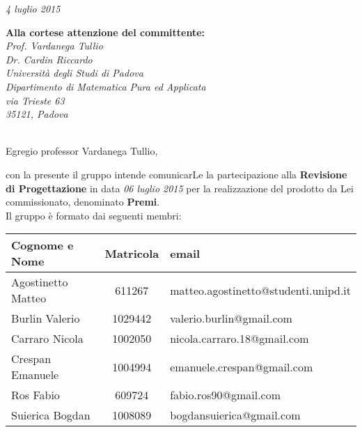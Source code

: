\begin{flushright}
	\textit{4 luglio 2015} \\
\end{flushright}

\noindent \textbf{Alla cortese attenzione del committente:}\\
\textit{
	Prof. Vardanega Tullio\\
	Dr. Cardin Riccardo\\
	Università degli Studi di Padova\\
	Dipartimento di Matematica Pura ed Applicata\\
	via Trieste 63\\
	35121, Padova\\ \\
}


\noindent Egregio professor Vardanega Tullio,

con la presente il gruppo \GRUPPO intende comunicarLe la partecipazione alla \textbf{Revisione di Progettazione} in data \textit{06 luglio 2015} per la realizzazione del prodotto da Lei commissionato, denominato \textbf{Premi}.\\


\noindent Il gruppo è formato dai seguenti membri:\\

\begin{tabular}{|l|c|l|}
	\toprule
		\textbf{Cognome e Nome}  & \textbf{Matricola}  & \textbf{email}  \\ \midrule
		Agostinetto Matteo  & 611267 & matteo.agostinetto@studenti.unipd.it \\ 
		Burlin Valerio & 1029442 & valerio.burlin@gmail.com \\ 
		Carraro Nicola & 1002050 & nicola.carraro.18@gmail.com \\ 
		Crespan Emanuele & 1004994 & emanuele.crespan@gmail.com \\ 
		Ros Fabio & 609724 & fabio.ros90@gmail.com \\ 
		Suierica Bogdan  & 1008089 & bogdansuierica@gmail.com \\
		
	\bottomrule
\end{tabular}

\vspace{20px}

